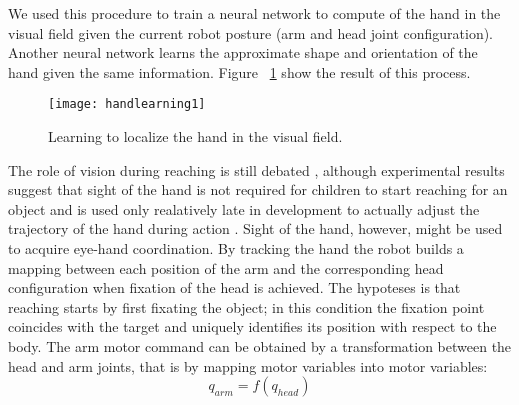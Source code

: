 We used this procedure to train a neural network to compute of the hand in the visual field given the current robot posture (arm and head joint configuration). Another neural network learns the approximate shape and orientation of the hand given the same information. Figure ~\ref{handlearning1} show the result of this process. 

\begin{figure}
\centering
\texttt{[image: handlearning1]}
\caption{Learning to localize the hand in the visual field.}
\label{handlearning1}
\end{figure}

The role of vision during reaching is still debated \cite{saunders03humans}, although experimental results suggest that sight of the hand is not required for children to start reaching for an object \cite{clifton93isvisually,clifton94multimodal} and is used only realatively late in development to actually adjust the trajectory of the hand during action \cite{ashmead93visual}. 
Sight of the hand, however, might be used to acquire eye-hand coordination. By tracking the hand the robot builds a mapping between each position of the arm and the corresponding head configuration when fixation of the head is achieved. The hypoteses is that reaching starts by first fixating the object; in this condition the fixation point coincides with the target and uniquely identifies its position with respect to the body. The arm motor command can be obtained by a transformation between the head and arm joints, that is by mapping motor variables into motor variables:
\begin{equation}q_{arm}=f(q_{head})\end{equation}